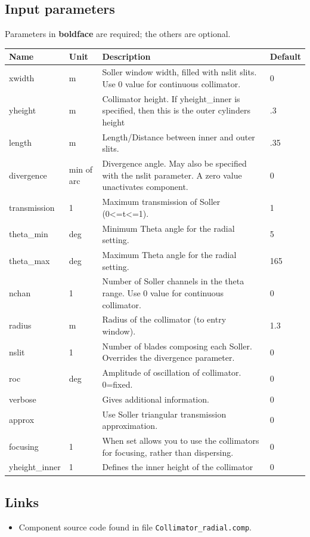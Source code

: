 \subsection*{Input parameters}
Parameters in \textbf{boldface} are required; the others are optional.

\begin{longtable}{p{}p{}p{}p{}}
\toprule
\textbf{Name} & \textbf{Unit} & \textbf{Description} & \textbf{Default} \\
\midrule
\endhead
xwidth & m & Soller  window width, filled with nslit slits. Use 0 value for continuous collimator. & 0 \\
yheight & m & Collimator height. If  yheight\_inner is specified, then this is the outer cylinders height & .3 \\
length & m & Length/Distance between inner and outer slits. & .35 \\
divergence & min of arc & Divergence angle. May also be specified with the nslit parameter. A zero value unactivates component. & 0 \\
transmission & 1 & Maximum transmission of Soller (0\textless{}=t\textless{}=1). & 1 \\
theta\_min & deg & Minimum Theta angle for the radial setting. & 5 \\
theta\_max & deg & Maximum Theta angle for the radial setting. & 165 \\
nchan & 1 & Number of Soller channels in the theta range. Use 0 value for continuous collimator. & 0 \\
radius & m & Radius of the collimator (to entry window). & 1.3 \\
nslit & 1 & Number of blades composing each Soller. Overrides the divergence parameter. & 0 \\
roc & deg & Amplitude of oscillation of collimator. 0=fixed. & 0 \\
verbose &  & Gives additional information. & 0 \\
approx &  & Use Soller triangular transmission approximation. & 0 \\
focusing & 1 & When set allows you to use the collimators for focusing, rather than dispersing. & 0 \\
yheight\_inner & 1 & Defines the inner height of the collimator & 0 \\
\bottomrule
\end{longtable}

\subsection*{Links}
\begin{itemize}
  \item Component source code found in file \texttt{Collimator\_radial.comp}.
\end{itemize}

